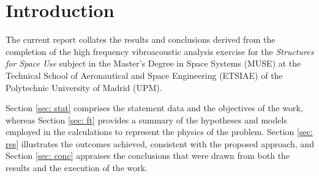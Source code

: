 \section{Introduction}


The current report collates the results and conclusions derived from the completion of the high frequency vibroacoustic analysis exercise for the \textit{Structures for Space Use} subject in the Master's Degree in Space Systems (MUSE) at the Technical School of Aeronautical and Space Engineering (ETSIAE) of the Polytechnic University of Madrid (UPM).

Section \ref{sec: stat} comprises the statement data and the objectives of the work, whereas Section \ref{sec: ft} provides a summary of the hypotheses and models employed in the calculations to represent the physics of the problem. Section \ref{sec: res} illustrates the outcomes achieved, consistent with the proposed approach, and Section \ref{sec: conc} appraises the conclusions that were drawn from both the results and the execution of the work.